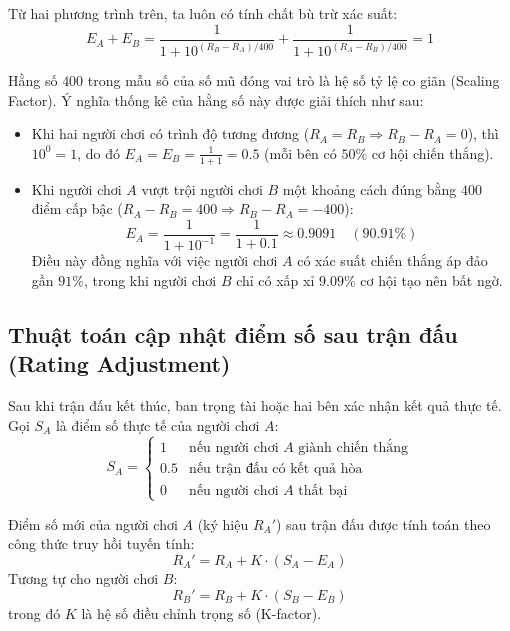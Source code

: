 Từ hai phương trình trên, ta luôn có tính chất bù trừ xác suất:
\begin{equation}
    E_A + E_B = \frac{1}{1 + 10^{(R_B - R_A) / 400}} + \frac{1}{1 + 10^{(R_A - R_B) / 400}} = 1
\end{equation}

Hằng số $400$ trong mẫu số của số mũ đóng vai trò là hệ số tỷ lệ co giãn (Scaling Factor). Ý nghĩa thống kê của hằng số này được giải thích như sau:
\begin{itemize}[leftmargin=1.5cm]
    \item Khi hai người chơi có trình độ tương đương ($R_A = R_B \Rightarrow R_B - R_A = 0$), thì $10^0 = 1$, do đó $E_A = E_B = \frac{1}{1 + 1} = 0.5$ (mỗi bên có $50\%$ cơ hội chiến thắng).
    \item Khi người chơi $A$ vượt trội người chơi $B$ một khoảng cách đúng bằng $400$ điểm cấp bậc ($R_A - R_B = 400 \Rightarrow R_B - R_A = -400$):
    \begin{equation}
        E_A = \frac{1}{1 + 10^{-1}} = \frac{1}{1 + 0.1} \approx 0.9091 \quad (90.91\%)
    \end{equation}
    Điều này đồng nghĩa với việc người chơi $A$ có xác suất chiến thắng áp đảo gần $91\%$, trong khi người chơi $B$ chỉ có xấp xỉ $9.09\%$ cơ hội tạo nên bất ngờ.
\end{itemize}

\subsection{Thuật toán cập nhật điểm số sau trận đấu (Rating Adjustment)}
Sau khi trận đấu kết thúc, ban trọng tài hoặc hai bên xác nhận kết quả thực tế. Gọi $S_A$ là điểm số thực tế của người chơi $A$:
\begin{equation}
    S_A = \begin{cases} 
        1 & \text{nếu người chơi } A \text{ giành chiến thắng} \\
        0.5 & \text{nếu trận đấu có kết quả hòa} \\
        0 & \text{nếu người chơi } A \text{ thất bại}
    \end{cases}
\end{equation}

Điểm số mới của người chơi $A$ (ký hiệu $R_A'$) sau trận đấu được tính toán theo công thức truy hồi tuyến tính:
\begin{equation}
    R_A' = R_A + K \cdot (S_A - E_A)
    \label{eq:elo_update_formula}
\end{equation}
Tương tự cho người chơi $B$:
\begin{equation}
    R_B' = R_B + K \cdot (S_B - E_B)
\end{equation}
trong đó $K$ là hệ số điều chỉnh trọng số (K-factor). 

